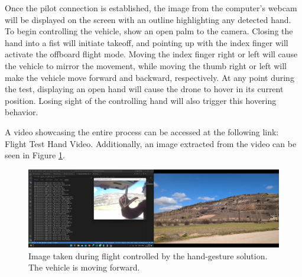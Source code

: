 Once the pilot connection is established, the image from the computer's webcam will be displayed on the screen with an outline highlighting any detected hand. To begin controlling the vehicle, show an open palm to the camera. Closing the hand into a fist will initiate takeoff, and pointing up with the index finger will activate the offboard flight mode. Moving the index finger right or left will cause the vehicle to mirror the movement, while moving the thumb right or left will make the vehicle move forward and backward, respectively. At any point during the test, displaying an open hand will cause the drone to hover in its current position. Losing sight of the controlling hand will also trigger this hovering behavior.


A video showcasing the entire process can be accessed at the following link: Flight Test Hand Video. Additionally, an image extracted from the video can be seen in Figure \ref{fig:flight-test-hand}.

\begin{figure}
  \centering
  \includegraphics[width=\textwidth, keepaspectratio]{img/video-field-test-hand.png}
  \caption{Image taken during flight controlled by the hand-gesture solution. The vehicle is moving forward.}
  \label{fig:flight-test-hand}
\end{figure}

